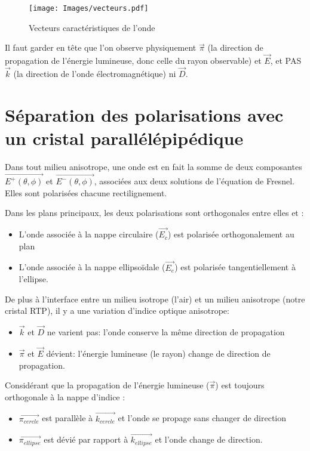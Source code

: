 \documentclass[a4paper,11pt]{report}
\begin{document}
\begin{figure}[h]
    \begin{center}
        \texttt{[image: Images/vecteurs.pdf]}
        \caption{Vecteurs caractéristiques de l'onde}
        \label{vecteurs}
    \end{center}
\end{figure}


Il faut garder en tête que l'on observe physiquement $\vec{\pi}$ (la direction de propagation de l'énergie lumineuse, donc celle du rayon observable) et $\vec{E}$, et PAS $\vec{k}$ (la direction de l'onde électromagnétique) ni $\vec{D}$.

\section{Séparation des polarisations avec un cristal parallélépipédique}
Dans tout milieu anisotrope, une onde est en fait la somme de deux composantes $\vec{E^+(\theta,\phi)}$ et $\vec{E^-(\theta,\phi)}$, associées aux deux solutions de l'équation de Fresnel. Elles sont polarisées chacune rectilignement.

Dans les plans principaux, les deux polarisations sont orthogonales entre elles et :
\begin{itemize}
    \item L'onde associée à la nappe circulaire ($\vec{E_c}$) est polarisée orthogonalement au plan
    \item L'onde associée à la nappe ellipsoïdale ($\vec{E_e}$) est polarisée tangentiellement à l'ellipse.
\end{itemize}

\newpage
De plus à l'interface entre un milieu isotrope (l'air) et un milieu anisotrope (notre cristal RTP), il y a une variation d'indice optique anisotrope:
\begin{itemize}
    \item $\vec{k}$ et $\vec{D}$ ne varient pas: l'onde conserve la même direction de propagation
    \item $\vec{\pi}$ et $\vec{E}$ dévient: l'énergie lumineuse (le rayon) change de direction de propagation.\newline
\end{itemize}

Considérant que la propagation de l'énergie lumineuse ($\vec{\pi}$) est toujours orthogonale à la nappe d'indice :
\begin{itemize}
    \item $\vec{\pi_{cercle}}$ est parallèle à $\vec{k_{cercle}}$ et l'onde se propage sans changer de direction
    \item $\vec{\pi_{ellipse}}$ est dévié par rapport à $\vec{k_{ellipse}}$ et l'onde change de direction.
\end{itemize}
\end{document}
